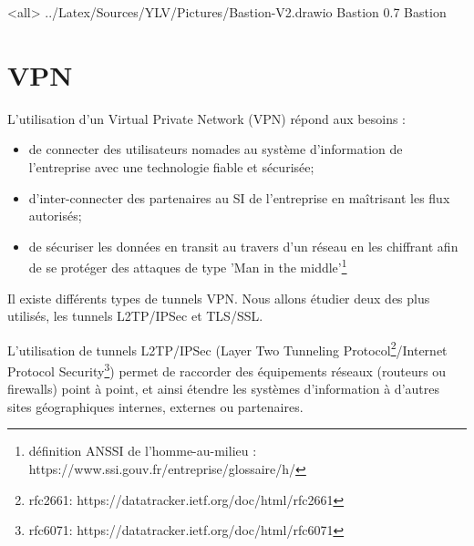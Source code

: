 

\mode<all>{\picframe
{../Latex/Sources/YLV/Pictures/Bastion-V2.drawio}%
{Bastion} %
{0.7} %
{Bastion} %
}

\section{VPN}

L'utilisation d'un Virtual Private Network (VPN) répond aux besoins :
\begin{itemize}
    \item de connecter des utilisateurs nomades au système d'information de l'entreprise avec une technologie fiable et sécurisée;
    \item d'inter-connecter des partenaires au SI de l'entreprise en maîtrisant les flux autorisés;
    \item de sécuriser les données en transit au travers d'un réseau en les chiffrant afin de se protéger des attaques de type 'Man in the middle'\footnote{définition ANSSI de l'homme-au-milieu : https://www.ssi.gouv.fr/entreprise/glossaire/h/}
\end{itemize}

Il existe différents types de tunnels VPN. Nous allons étudier deux des plus utilisés, les tunnels L2TP/IPSec et TLS/SSL.

L'utilisation de tunnels L2TP/IPSec (Layer Two Tunneling Protocol\footnote{rfc2661: https://datatracker.ietf.org/doc/html/rfc2661}/Internet Protocol Security\footnote{rfc6071: https://datatracker.ietf.org/doc/html/rfc6071}) permet de raccorder des équipements réseaux (routeurs ou firewalls) point à point, et ainsi étendre les systèmes d'information à d'autres sites géographiques internes, externes ou partenaires.

